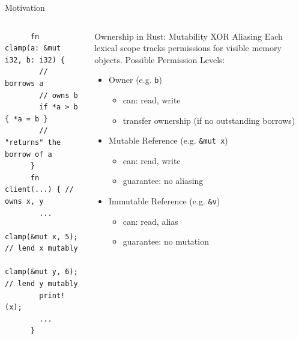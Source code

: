 \documentclass{sdqbeamer}
\newcommand{\code}[1]{\texttt{#1}}
\begin{document}
\begin{frame}[fragile]{Motivation}{}
  \begin{columns}
    \begin{verbatim}
      fn  clamp(a: &mut i32, b: i32) { 
        // borrows a
        // owns b
        if *a > b { *a = b }
        // "returns" the borrow of a
      }
      fn  client(...) { // owns x, y
        ...
        clamp(&mut x, 5); // lend x mutably
        clamp(&mut y, 6); // lend y mutably
        print!(x);
        ...
      }
    \end{verbatim}

    \begin{greenblock}{Ownership in Rust: Mutability XOR Aliasing}
      Each lexical scope tracks permissions for visible memory objects.
      Possible Permission Levels:
      \begin{itemize}
        \item Owner (e.g. \code{b})
          \begin{itemize}
            \item can: read, write
            \item transfer ownership (if no outstanding borrows)
          \end{itemize}
        \item Mutable Reference (e.g. \code{\&mut x})
          \begin{itemize}
            \item can: read, write
            \item guarantee: no aliasing
          \end{itemize}
        \item Immutable Reference (e.g. \code{\&v})
          \begin{itemize}
            \item can: read, alias
            \item guarantee: no mutation
          \end{itemize}
      \end{itemize}
    \end{greenblock}
  \end{columns}
  \note{
    - 
  }
\end{frame}
\end{document}
